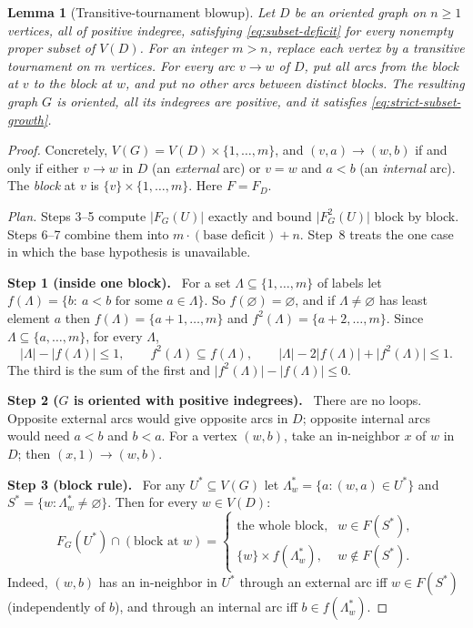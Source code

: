 \documentclass[11pt]{article}
\newtheorem{lemma}[theorem]{Lemma}
\theoremstyle{remark}
\newcommand{\abs}[1]{\lvert #1\rvert}
\newcommand{\step}[1]{\par\medskip\noindent\textbf{Step #1.}\ }
\begin{document}
\begin{lemma}[Transitive-tournament blowup]
\label{lem:blowup}
Let $D$ be an oriented graph on $n\ge1$ vertices, all of positive
indegree, satisfying \eqref{eq:subset-deficit} for every nonempty proper
subset of $V(D)$. For an integer $m>n$, replace each vertex by a
transitive tournament on $m$ vertices. For every arc $v\to w$ of $D$,
put all arcs from the block at $v$ to the block at $w$, and put no other
arcs between distinct blocks. The resulting graph $G$ is oriented,
all its indegrees are positive, and it satisfies
\eqref{eq:strict-subset-growth}.
\end{lemma}

\begin{proof}
Concretely, $V(G)=V(D)\times\{1,\dots,m\}$, and $(v,a)\to(w,b)$ if and only
if either $v\to w$ in $D$ (an \emph{external} arc) or $v=w$ and $a<b$ (an
\emph{internal} arc). The \emph{block} at $v$ is $\{v\}\times\{1,\dots,m\}$.
Here $F=F_D$.

\emph{Plan.} Steps 3--5 compute $\abs{F_G(U)}$ exactly and bound
$\abs{F_G^2(U)}$ block by block. Steps 6--7 combine them into
$m\cdot(\text{base deficit})+n$. Step~8 treats the one case in which the base
hypothesis is unavailable.

\step{1 (inside one block)}
For a set $\Lambda\subseteq\{1,\dots,m\}$ of labels let
$f(\Lambda)=\{b:\ a<b\text{ for some }a\in\Lambda\}$. So
$f(\varnothing)=\varnothing$, and if $\Lambda\neq\varnothing$ has least element
$a$ then $f(\Lambda)=\{a+1,\ldots,m\}$ and $f^2(\Lambda)=\{a+2,\ldots,m\}$.
Since $\Lambda\subseteq\{a,\dots,m\}$, for every $\Lambda$,
\begin{equation}
\label{eq:internal-block-bound}
  \abs{\Lambda}-\abs{f(\Lambda)}\le1,\qquad
  f^2(\Lambda)\subseteq f(\Lambda),\qquad
  \abs{\Lambda}-2\abs{f(\Lambda)}+\abs{f^2(\Lambda)}\le1.
\end{equation}
The third is the sum of the first and $\abs{f^2(\Lambda)}-\abs{f(\Lambda)}\le0$.

\step{2 ($G$ is oriented with positive indegrees)}
There are no loops. Opposite external arcs would give opposite arcs in $D$;
opposite internal arcs would need $a<b$ and $b<a$. For a vertex $(w,b)$, take
an in-neighbor $x$ of $w$ in $D$; then $(x,1)\to(w,b)$.

\step{3 (block rule)}
For any $U^\ast\subseteq V(G)$ let
$\Lambda^\ast_w=\{a:(w,a)\in U^\ast\}$ and
$S^\ast=\{w:\Lambda^\ast_w\ne\varnothing\}$. Then for every $w\in V(D)$:
\[
 F_G(U^\ast)\cap(\text{block at }w)=
 \begin{cases}
  \text{the whole block}, & w\in F(S^\ast),\\
  \{w\}\times f(\Lambda^\ast_w), & w\notin F(S^\ast).
 \end{cases}
\]
Indeed, $(w,b)$ has an in-neighbor in $U^\ast$ through an external arc iff
$w\in F(S^\ast)$ (independently of $b$), and through an internal arc iff
$b\in f(\Lambda^\ast_w)$.


\end{proof}
\end{document}
